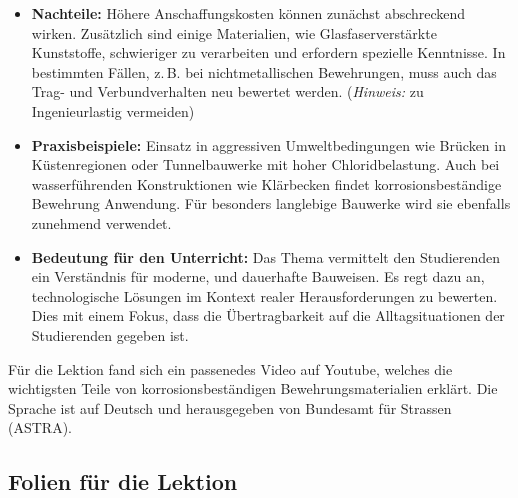 \documentclass[
11pt,
captions=tableheading,
headsepline,
footsepline, 
captions=tableheading,
parskip=half-,
]{scrartcl}
\begin{document}
\begin{itemize}
    \item \textbf{Nachteile:} Höhere Anschaffungskosten können zunächst abschreckend wirken. Zusätzlich sind einige Materialien, wie Glasfaserverstärkte Kunststoffe, schwieriger zu verarbeiten und erfordern spezielle Kenntnisse. In bestimmten Fällen, z.\,B. bei nichtmetallischen Bewehrungen, muss auch das Trag- und Verbundverhalten neu bewertet werden. (\textit{Hinweis:} zu Ingenieurlastig vermeiden)
    
    \item \textbf{Praxisbeispiele:} Einsatz in aggressiven Umweltbedingungen wie Brücken in Küstenregionen oder Tunnelbauwerke mit hoher Chloridbelastung. Auch bei wasserführenden Konstruktionen wie Klärbecken findet korrosionsbeständige Bewehrung Anwendung. Für besonders langlebige Bauwerke wird sie ebenfalls zunehmend verwendet.
    
    \item \textbf{Bedeutung für den Unterricht:} Das Thema vermittelt den Studierenden ein Verständnis für moderne,  und dauerhafte Bauweisen. Es regt dazu an, technologische Lösungen im Kontext realer Herausforderungen zu bewerten. Dies mit einem Fokus, dass die Übertragbarkeit auf die Alltagsituationen der Studierenden gegeben ist.
\end{itemize}


Für die Lektion fand sich ein passenedes Video auf Youtube, welches die wichtigsten Teile von korrosionsbeständigen Bewehrungsmaterialien erklärt.
Die Sprache ist auf Deutsch und herausgegeben von Bundesamt für Strassen (ASTRA).

\clearpage
\subsection{Folien für die Lektion}

\end{document}
